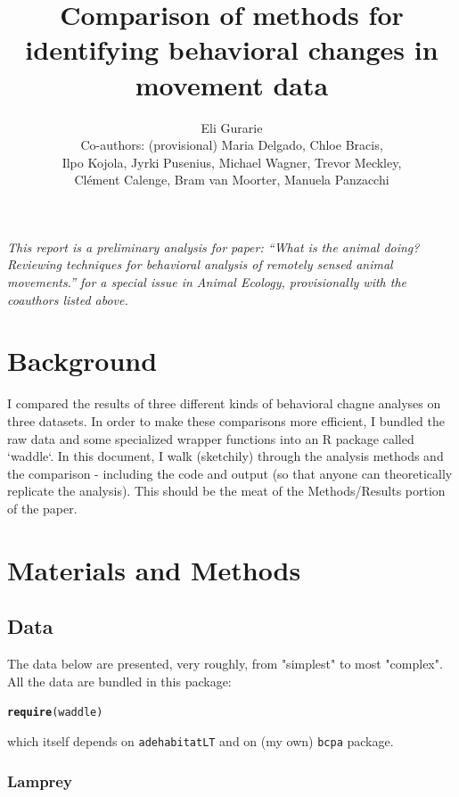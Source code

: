 \documentclass[10pt]{article}\usepackage{graphicx, color}
\title{Comparison of methods for identifying behavioral changes in movement data}
\author{Eli Gurarie\\
Co-authors: (provisional) Maria Delgado, Chloe Bracis, \\ 
Ilpo Kojola, Jyrki Pusenius, Michael Wagner, Trevor Meckley, \\
Cl\'ement Calenge, Bram van Moorter, Manuela Panzacchi}
\makeatletter
\newcommand{\hlfunctioncall}[1]{\textcolor[rgb]{0.501960784313725,0,0.329411764705882}{\textbf{#1}}}%
\newenvironment{kframe}{%
 \def\at@end@of@kframe{}%
 \ifinner\ifhmode%
  \def\at@end@of@kframe{\end{minipage}}%
  \begin{minipage}{\columnwidth}%
 \fi\fi%
 \def\FrameCommand##1{\hskip\@totalleftmargin \hskip-\fboxsep
 \colorbox{shadecolor}{##1}\hskip-\fboxsep
     \hskip-\linewidth \hskip-\@totalleftmargin \hskip\columnwidth}%
 \MakeFramed {\advance\hsize-\width
   \@totalleftmargin\z@ \linewidth\hsize
   \@setminipage}}%
 {\par\unskip\endMakeFramed%
 \at@end@of@kframe}
\newenvironment{knitrout}{}{} %
\makeatother
\begin{document}
\maketitle

\emph{ This report is a preliminary analysis for  paper: ``What is the animal doing?  Reviewing techniques for behavioral analysis of remotely sensed animal movements.'' for a special issue in \emph{Animal Ecology}, provisionally with the coauthors listed above.}

\section{Background}

I compared the results of three different kinds of behavioral chagne analyses on three datasets.  In order to make these comparisons more efficient, I bundled the raw data and some specialized wrapper functions into an R package called `waddle`.  In this document, I walk (sketchily) through the analysis methods and the comparison - including the code and output (so that anyone can theoretically replicate the analysis).  This should be the meat of the Methods/Results portion of the paper.  



\section{Materials and Methods}

\subsection{Data}

The data below are presented, very roughly, from "simplest" to most "complex".  All the data are bundled in this package: 
\begin{knitrout}
\color{fgcolor}\begin{kframe}
\begin{alltt}
\hlfunctioncall{require}(waddle)
\end{alltt}
\end{kframe}
\end{knitrout}

which itself depends on \texttt{adehabitatLT} and on (my own) \texttt{bcpa} package.


\subsubsection{Lamprey}  
\end{document}
